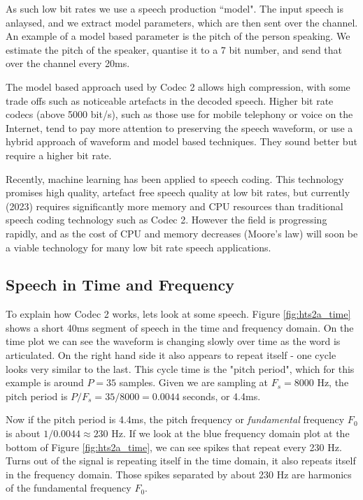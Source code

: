 \documentclass{article}
\begin{document}
As such low bit rates we use a speech production ``model".  The input speech is anlaysed, and we extract model parameters, which are then sent over the channel.  An example of a model based parameter is the pitch of the person speaking.  We estimate the pitch of the speaker, quantise it to a 7 bit number, and send that over the channel every 20ms.

The model based approach used by Codec 2 allows high compression, with some trade offs such as noticeable artefacts in the decoded speech.  Higher bit rate codecs (above 5000 bit/s), such as those use for mobile telephony or voice on the Internet, tend to pay more attention to preserving the speech waveform, or use a hybrid approach of waveform and model based techniques.  They sound better but require a higher bit rate.

Recently, machine learning has been applied to speech coding.  This technology promises high quality, artefact free speech quality at low bit rates, but currently (2023) requires significantly more memory and CPU resources than traditional speech coding technology such as Codec 2.  However the field is progressing rapidly, and as the cost of CPU and memory decreases (Moore's law) will soon be a viable technology for many low bit rate speech applications.

\subsection{Speech in Time and Frequency}

To explain how Codec 2 works, lets look at some speech. Figure \ref{fig:hts2a_time} shows a short 40ms segment of speech in the time and frequency domain.  On the time plot we can see the waveform is changing slowly over time as the word is articulated.  On the right hand side it also appears to repeat itself - one cycle looks very similar to the last.  This cycle time is the "pitch period", which for this example is around $P=35$ samples.  Given we are sampling at $F_s=8000$ Hz, the pitch period is $P/F_s=35/8000=0.0044$ seconds, or 4.4ms.

Now if the pitch period is 4.4ms, the pitch frequency or \emph{fundamental} frequency $F_0$ is about $1/0.0044 \approx 230$ Hz.  If we look at the blue frequency domain plot at the bottom of Figure \ref{fig:hts2a_time}, we can see spikes that repeat every 230 Hz.  Turns out of the signal is repeating itself in the time domain, it also repeats itself in the frequency domain.  Those spikes separated by about 230 Hz are harmonics of the fundamental frequency $F_0$.
\end{document}

